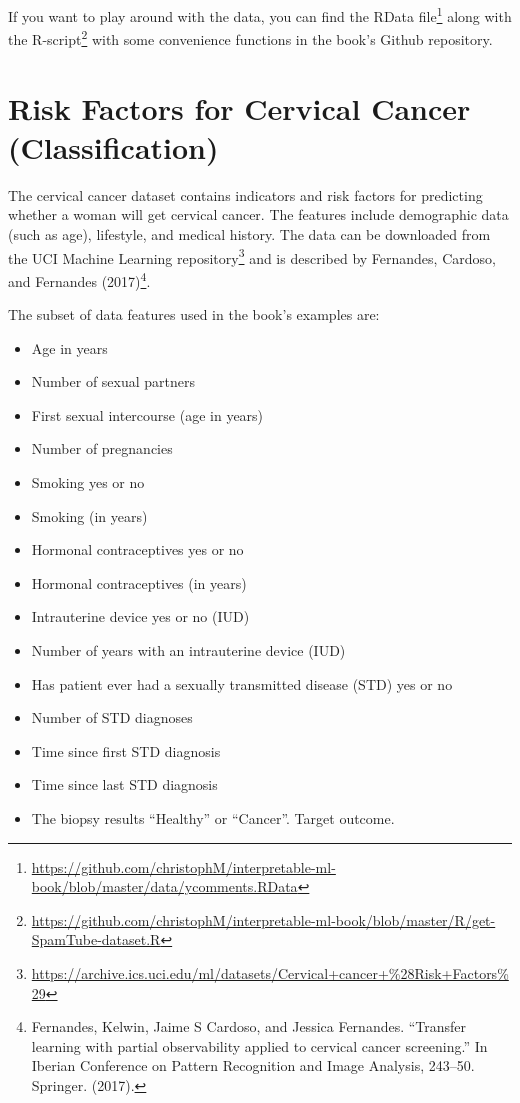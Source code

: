 \documentclass[
  10pt,
]{scrbook}
\providecommand{\tightlist}{%
  \setlength{\itemsep}{0pt}\setlength{\parskip}{0pt}}
\renewcommand{\href}[2]{#2\footnote{\url{#1}}}
\begin{document}
If you want to play around with the data, you can find the \href{https://github.com/christophM/interpretable-ml-book/blob/master/data/ycomments.RData}{RData file} along with the \href{https://github.com/christophM/interpretable-ml-book/blob/master/R/get-SpamTube-dataset.R}{R-script} with some convenience functions in the book's Github repository.

\hypertarget{cervical}{%
\section{Risk Factors for Cervical Cancer (Classification)}\label{cervical}}

The cervical cancer dataset contains indicators and risk factors for predicting whether a woman will get cervical cancer.
The features include demographic data (such as age), lifestyle, and medical history.
The data can be downloaded from the \href{https://archive.ics.uci.edu/ml/datasets/Cervical+cancer+\%28Risk+Factors\%29}{UCI Machine Learning repository} and is described by Fernandes, Cardoso, and Fernandes (2017)\footnote{Fernandes, Kelwin, Jaime S Cardoso, and Jessica Fernandes. ``Transfer learning with partial observability applied to cervical cancer screening.'' In Iberian Conference on Pattern Recognition and Image Analysis, 243--50. Springer. (2017).}.

The subset of data features used in the book's examples are:

\begin{itemize}
\tightlist
\item
  Age in years
\item
  Number of sexual partners
\item
  First sexual intercourse (age in years)
\item
  Number of pregnancies
\item
  Smoking yes or no
\item
  Smoking (in years)
\item
  Hormonal contraceptives yes or no
\item
  Hormonal contraceptives (in years)
\item
  Intrauterine device yes or no (IUD)
\item
  Number of years with an intrauterine device (IUD)
\item
  Has patient ever had a sexually transmitted disease (STD) yes or no
\item
  Number of STD diagnoses
\item
  Time since first STD diagnosis
\item
  Time since last STD diagnosis
\item
  The biopsy results ``Healthy'' or ``Cancer''. Target outcome.
\end{itemize}
\end{document}
